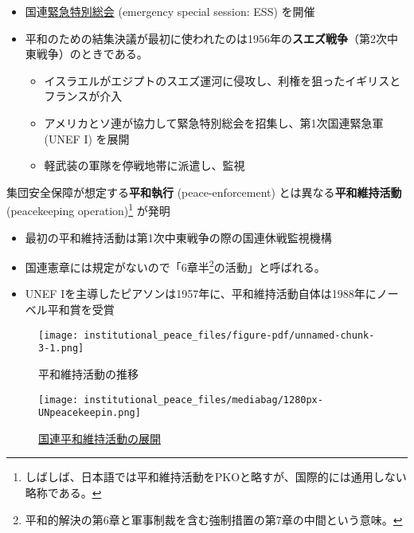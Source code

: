 \documentclass[
  xelatex,
  ja=standard]{bxjsarticle}
\providecommand{\tightlist}{%
  \setlength{\itemsep}{0pt}\setlength{\parskip}{0pt}}\usepackage{longtable,booktabs,array}
\begin{document}
\begin{itemize}
\tightlist
\item
  国連\href{https://www.un.org/en/ga/sessions/emergency.shtml}{緊急特別総会}
  (emergency special session: ESS) を開催
\item
  平和のための結集決議が最初に使われたのは1956年の\textbf{スエズ戦争}（第2次中東戦争）のときである。

  \begin{itemize}
  \tightlist
  \item
    イスラエルがエジプトのスエズ運河に侵攻し、利権を狙ったイギリスとフランスが介入
  \item
    アメリカとソ連が協力して緊急特別総会を招集し、第1次国連緊急軍 (UNEF
    I) を展開
  \item
    軽武装の軍隊を停戦地帯に派遣し、監視
  \end{itemize}
\end{itemize}

集団安全保障が想定する\textbf{平和執行} (peace-enforcement)
とは異なる\textbf{平和維持活動} (peacekeeping operation)\footnote{しばしば、日本語では平和維持活動をPKOと略すが、国際的には通用しない略称である。}
が発明

\begin{itemize}
\tightlist
\item
  最初の平和維持活動は第1次中東戦争の際の国連休戦監視機構
\item
  国連憲章には規定がないので「6章半\footnote{平和的解決の第6章と軍事制裁を含む強制措置の第7章の中間という意味。}の活動」と呼ばれる。
\item
  UNEF
  Iを主導したピアソンは1957年に、平和維持活動自体は1988年にノーベル平和賞を受賞
\end{itemize}

\begin{figure}[htpb]

{\centering \texttt{[image: institutional\_peace\_files/figure-pdf/unnamed-chunk-3-1.png]}

}

\caption{平和維持活動の推移}

\end{figure}

\begin{figure}[htpb]

{\centering \texttt{[image: institutional\_peace\_files/mediabag/1280px-UNpeacekeepin.png]}

}

\caption{\href{https://commons.wikimedia.org/wiki/File:UNpeacekeeping.svg}{国連平和維持活動の展開}}

\end{figure}
\end{document}
